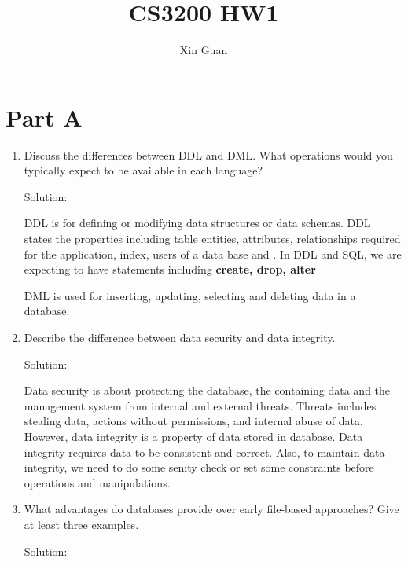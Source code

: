 \documentclass[12pt]{article}
\title{CS3200 HW1}
\date{}
\author{Xin Guan}
\newcommand{\solu}{{\color{blue} Solution:}}
\begin{document}
    \maketitle

    \section{Part A}
    \begin{enumerate}
        \item Discuss the differences between DDL and DML. What operations would you typically expect to be available in each language? 
        
        \solu

        DDL is for defining or modifying data structures or data schemas. DDL states the properties including table entities, attributes, relationships required for the application, index, users of a data base and . In DDL and SQL, we are expecting to have statements including \textbf{create, drop, alter}

        DML is used for inserting, updating, selecting and deleting data in a database. 

        \item Describe the difference between data security and data integrity. 
        
        \solu

        Data security is about protecting the database, the containing data and the management system from internal and external threats. Threats includes stealing data, actions without permissions, and internal abuse of data. However, data integrity is a property of data stored in database. Data integrity requires data to be consistent and correct. Also, to maintain data integrity, we need to do some senity check or set some constraints before operations and manipulations.
        \item What advantages do databases provide over early file-based approaches? Give at least three examples.
        
        \solu


\end{enumerate}
\end{document}
